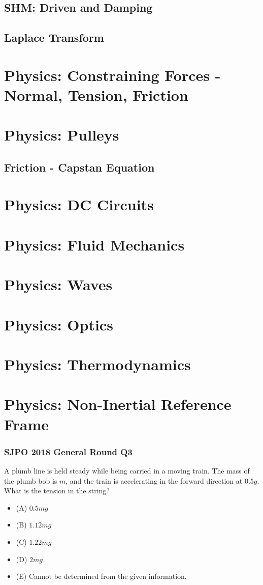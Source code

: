\documentclass{article}
\begin{document}
\subsection{SHM: Driven and Damping}
\subsection{Laplace Transform}

\section{Physics: Constraining Forces - Normal, Tension, Friction}
\section{Physics: Pulleys}
\subsection{Friction - Capstan Equation}
\section{Physics: DC Circuits}
\section{Physics: Fluid Mechanics}
\section{Physics: Waves}
\section{Physics: Optics}
\section{Physics: Thermodynamics}
\section{Physics: Non-Inertial Reference Frame}
\subsubsection{SJPO 2018 General Round Q3}
A plumb line is held steady while being carried in a moving train. The mass of the plumb bob is $m$, and the train is accelerating in the forward direction at $0.5 g$. What is the tension in the string?
\begin{itemize}
\item[] (A) $0.5 mg$
\item[] (B) $1.12 mg$
\item[] (C) $1.22 mg$
\item[] (D) $2 mg$
\item[] (E) Cannot be determined from the given information.
\end{itemize}
\end{document}
